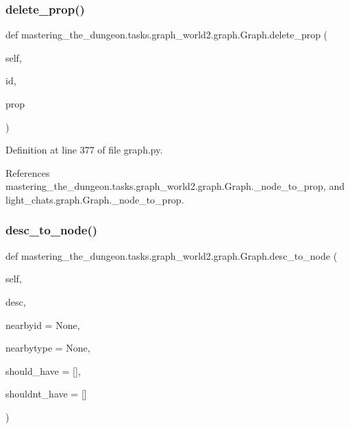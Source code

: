 \subsubsection{\texorpdfstring{delete\+\_\+prop()}{delete\_prop()}}
{\footnotesize\ttfamily def mastering\+\_\+the\+\_\+dungeon.\+tasks.\+graph\+\_\+world2.\+graph.\+Graph.\+delete\+\_\+prop (\begin{DoxyParamCaption}\item[{}]{self,  }\item[{}]{id,  }\item[{}]{prop }\end{DoxyParamCaption})}



Definition at line 377 of file graph.\+py.



References mastering\+\_\+the\+\_\+dungeon.\+tasks.\+graph\+\_\+world2.\+graph.\+Graph.\+\_\+node\+\_\+to\+\_\+prop, and light\+\_\+chats.\+graph.\+Graph.\+\_\+node\+\_\+to\+\_\+prop.

\mbox{\label{classmastering__the__dungeon_1_1tasks_1_1graph__world2_1_1graph_1_1Graph_ad92850262273554e999408b6ba3f2d44}} 
\subsubsection{\texorpdfstring{desc\+\_\+to\+\_\+node()}{desc\_to\_node()}}
{\footnotesize\ttfamily def mastering\+\_\+the\+\_\+dungeon.\+tasks.\+graph\+\_\+world2.\+graph.\+Graph.\+desc\+\_\+to\+\_\+node (\begin{DoxyParamCaption}\item[{}]{self,  }\item[{}]{desc,  }\item[{}]{nearbyid = {\ttfamily None},  }\item[{}]{nearbytype = {\ttfamily None},  }\item[{}]{should\+\_\+have = {\ttfamily \mbox{[}\mbox{]}},  }\item[{}]{shouldnt\+\_\+have = {\ttfamily \mbox{[}\mbox{]}} }\end{DoxyParamCaption})}



